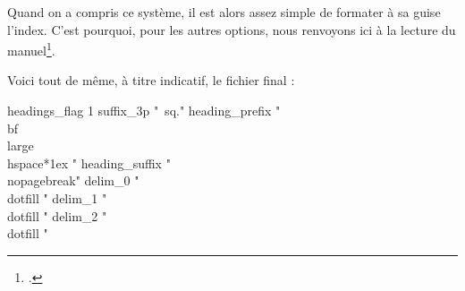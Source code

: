 Quand on a compris ce système, il est alors assez simple de formater à sa guise l'index. C'est pourquoi, pour les autres options, nous renvoyons ici à la lecture du manuel\footcite[On pourra aussi consulter][]{frama_index}. 

Voici tout de même, à titre indicatif, le fichier final :

\begin{latexcode}
headings_flag 1
suffix_3p "~sq."
heading_prefix "{\\bf\\large\\hspace*{1ex} " 
heading_suffix " }\\nopagebreak\n" 
delim_0 "\\dotfill "
delim_1 "\\dotfill "
delim_2 "\\dotfill "
\end{latexcode}




